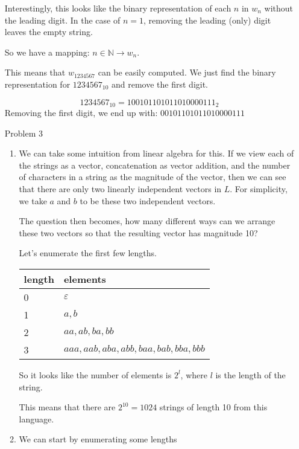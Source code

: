 \documentclass[12pt,letterpaper]{article}
\begin{document}
\begin{enumerate}
      Interestingly, this looks like the binary representation of each $n$ in $w_n$ without the leading digit.
      In the case of $n = 1$, removing the leading (only) digit leaves the empty string.

      So we have a mapping: $n \in \mathbb{N} \rightarrow w_n$.

      This means that $w_{1234567}$ can be easily computed.
      We just find the binary representation for $1234567_{10}$ and remove the first digit.

      \[1234567_{10} = 100101101011010000111_2\]
      Removing the first digit, we end up with: $00101101011010000111$

    \item[Problem 3]
      \begin{enumerate}
        \item
          We can take some intuition from linear algebra for this.
          If we view each of the strings as a vector,
          concatenation as vector addition,
          and the number of characters in a string as the magnitude of the vector,
          then we can see that there are only two linearly independent vectors in $L$.
          For simplicity, we take $a$ and $b$ to be these two independent vectors.

          The question then becomes,
          how many different ways can we arrange these two vectors so that the resulting vector has magnitude 10?

          Let's enumerate the first few lengths.

          \begin{tabular}{l | l}
            \multicolumn{1}{l}{length} & \multicolumn{1}{l}{elements} \\
            \hline
            0 & $\varepsilon$\\
            1 & $a, b$ \\
            2 & $aa, ab, ba, bb$ \\
            3 & $aaa, aab, aba, abb, baa, bab, bba, bbb$
          \end{tabular}

          So it looks like the number of elements is $2^{l}$, where $l$ is the length of the string.

          This means that there are $2^{10} = 1024$ strings of length 10 from this language.

        \item
          We can start by enumerating some lengths


\end{enumerate}
\end{enumerate}
\end{document}
